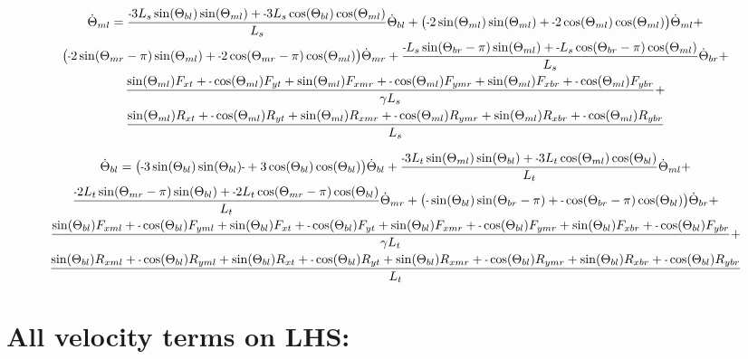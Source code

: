 \documentclass[11pt, landscape]{article}
\newcommand{\mn}{\scalebox{0.7}[1.0]{-}}
\begin{document}
\begin{multline}
\dot{\Theta}_{ml} =
\frac{\mn 3L_{s}\sin(\Theta_{bl})\sin(\Theta_{ml}) + \mn3L_{s}\cos(\Theta_{bl})\cos(\Theta_{ml})}{L_s}\dot{\Theta}_{bl} + 
\big(\mn 2\sin(\Theta_{ml})\sin(\Theta_{ml}) + \mn 2\cos(\Theta_{ml})\cos(\Theta_{ml}) \big)\dot{\Theta}_{ml} + \\
\big(\mn 2\sin(\Theta_{mr}-\pi)\sin(\Theta_{ml}) + \mn 2\cos(\Theta_{mr}-\pi)\cos(\Theta_{ml}) \big)\dot{\Theta}_{mr} + 
\frac{\mn L_{s}\sin(\Theta_{br}-\pi)\sin(\Theta_{ml}) + \mn L_{s}\cos(\Theta_{br}-\pi)\cos(\Theta_{ml})}{L_s}\dot{\Theta}_{br} + \\
\frac{\sin(\Theta_{ml})F_{xt } + \mn \cos(\Theta_{ml})F_{yt } + \sin(\Theta_{ml})F_{xmr} + \mn \cos(\Theta_{ml})F_{ymr} + \sin(\Theta_{ml})F_{xbr} + \mn \cos(\Theta_{ml})F_{ybr}}{\gamma L_s} + \\
\frac{\sin(\Theta_{ml})R_{xt } + \mn \cos(\Theta_{ml})R_{yt } + \sin(\Theta_{ml})R_{xmr} + \mn \cos(\Theta_{ml})R_{ymr} + \sin(\Theta_{ml})R_{xbr} + \mn \cos(\Theta_{ml})R_{ybr}}{L_s}
\end{multline}



\begin{multline}
\dot{\Theta}_{bl} =
\big(\mn 3\sin(\Theta_{bl})\sin(\Theta_{bl})\mn + 3\cos(\Theta_{bl})\cos(\Theta_{bl}) \big)\dot{\Theta}_{bl} +
\frac{\mn 3L_{t}\sin(\Theta_{ml})\sin(\Theta_{bl}) + \mn 3L_{t}\cos(\Theta_{ml})\cos(\Theta_{bl})}{L_t}\dot{\Theta}_{ml} + \\
\frac{\mn 2L_{t}\sin(\Theta_{mr}-\pi)\sin(\Theta_{bl}) + \mn 2L_{t}\cos(\Theta_{mr}-\pi)\cos(\Theta_{bl})}{L_t}\dot{\Theta}_{mr} +
\big(\mn \sin(\Theta_{bl}) \sin(\Theta_{br}-\pi) + \mn \cos(\Theta_{br}-\pi)\cos(\Theta_{bl})\big) \dot{\Theta}_{br} + \\
\frac{\sin(\Theta_{bl})F_{xml} + \mn\cos(\Theta_{bl})F_{yml} + \sin(\Theta_{bl})F_{xt } + \mn \cos(\Theta_{bl})F_{yt } + \sin(\Theta_{bl})F_{xmr} + \mn \cos(\Theta_{bl})F_{ymr} + \sin(\Theta_{bl})F_{xbr} + \mn \cos(\Theta_{bl})F_{ybr}}{\gamma L_t} + \\
\frac{\sin(\Theta_{bl})R_{xml} + \mn \cos(\Theta_{bl})R_{yml} + \sin(\Theta_{bl})R_{xt } + \mn \cos(\Theta_{bl})R_{yt} + \sin(\Theta_{bl})R_{xmr} + \mn \cos(\Theta_{bl})R_{ymr} + \sin(\Theta_{bl})R_{xbr} + \mn \cos(\Theta_{bl})R_{ybr}}{L_t}
\end{multline}

\section{All velocity terms on LHS:}
\end{document}
